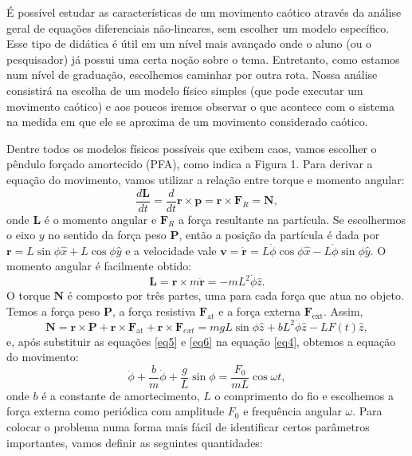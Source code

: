 \documentclass{article}
\begin{document}
É possível estudar as características de um movimento caótico através da análise geral de equações diferenciais não-lineares, sem escolher um modelo específico. Esse tipo de didática é útil em um nível mais avançado onde o aluno (ou o pesquisador) já possui uma certa noção sobre o tema. Entretanto, como estamos num nível de graduação, escolhemos caminhar por outra rota. Nossa análise consistirá na escolha de um modelo físico simples (que pode executar um movimento caótico) e aos poucos iremos observar o que acontece com o sistema na medida em que ele se aproxima de um movimento considerado caótico.  

Dentre todos os modelos físicos possíveis que exibem caos, vamos escolher o pêndulo forçado amortecido (PFA), como indica a Figura 1. Para derivar a equação do movimento, vamos utilizar a relação entre torque e momento angular:
\begin{equation}
    \frac{d\mathbf{L}}{dt} = \frac{d}{dt}\mathbf{r}\times\mathbf{p} = \mathbf{r}\times\mathbf{F}_R = \mathbf{N},
    \label{eq4}
\end{equation}
onde $\mathbf{L}$ é o momento angular e $\mathbf{F}_R$ a força resultante na partícula. Se escolhermos o eixo $y$ no sentido da força peso $\mathbf{P}$, então a posição da partícula é dada por $\mathbf{r} = L\sin\phi\hat{x} + L\cos\phi\hat{y}$ e a velocidade vale $\mathbf{v} = \dot{\mathbf{r}} = L\dot{\phi}\cos\phi\hat{x} - L\dot{\phi}\sin\phi\hat{y}$. O momento angular é facilmente obtido:
\begin{equation}
    \mathbf{L} = \mathbf{r}\times m\mathbf{\dot{r}} = -mL^{2}\dot{\phi}\hat{z}.
    \label{eq5}
\end{equation}
O torque $\mathbf{N}$ é composto por três partes, uma para cada força que atua no objeto. Temos a força peso $\mathbf{P}$, a força resistiva $\mathbf{F}_\text{at}$ e a força externa $\mathbf{F}_\text{ext}$. Assim,
\begin{equation}
    \mathbf{N} = \mathbf{r}\times\mathbf{P} +\mathbf{r}\times\mathbf{F}_\text{at} + \mathbf{r}\times\mathbf{F}_{ext} = mgL\sin\phi\hat{z} + bL^{2}\dot{\phi}\hat{z} - LF(t)\hat{z},
    \label{eq6}
\end{equation}
e, após substituir as equações \eqref{eq5} e \eqref{eq6} na equação \eqref{eq4}, obtemos a equação do movimento:
\begin{equation}
    \ddot{\phi} + \frac{b}{m}\dot{\phi} + \frac{g}{L}\sin\phi = \frac{F_0}{mL}\cos\omega t,
\end{equation}
onde $b$ é a constante de amortecimento, $L$ o comprimento do fio e escolhemos a força externa como periódica com amplitude $F_0$ e frequência angular $\omega$. Para colocar o problema numa forma mais fácil de identificar certos parâmetros importantes, vamos definir as seguintes quantidades:
\end{document}
